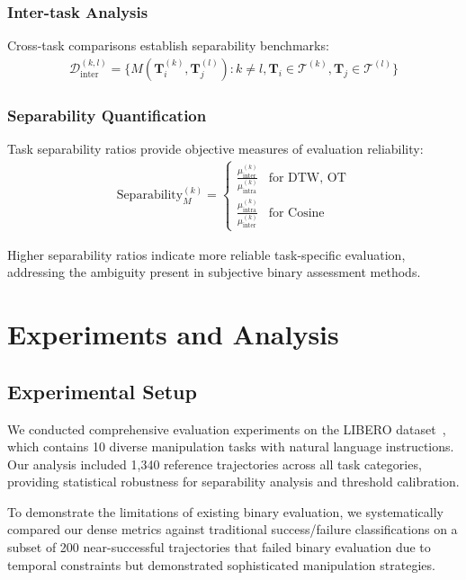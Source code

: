 \documentclass[10pt,twocolumn]{article}
\begin{document}
\subsubsection{Inter-task Analysis}
Cross-task comparisons establish separability benchmarks:
\begin{align}
\mathcal{D}_{\text{inter}}^{(k,l)} = \{M(\mathbf{T}_i^{(k)}, \mathbf{T}_j^{(l)}) : k \neq l, \mathbf{T}_i \in \mathcal{T}^{(k)}, \mathbf{T}_j \in \mathcal{T}^{(l)}\}
\end{align}

\subsubsection{Separability Quantification}
Task separability ratios provide objective measures of evaluation reliability:
\begin{align}
\text{Separability}_M^{(k)} = \begin{cases}
\frac{\mu_{\text{inter}}^{(k)}}{\mu_{\text{intra}}^{(k)}} & \text{for DTW, OT} \\
\frac{\mu_{\text{intra}}^{(k)}}{\mu_{\text{inter}}^{(k)}} & \text{for Cosine}
\end{cases}
\end{align}

Higher separability ratios indicate more reliable task-specific evaluation, addressing the ambiguity present in subjective binary assessment methods.

\section{Experiments and Analysis}

\subsection{Experimental Setup}

We conducted comprehensive evaluation experiments on the LIBERO dataset~\cite{liu2023libero}, which contains 10 diverse manipulation tasks with natural language instructions. Our analysis included 1,340 reference trajectories across all task categories, providing statistical robustness for separability analysis and threshold calibration.

To demonstrate the limitations of existing binary evaluation, we systematically compared our dense metrics against traditional success/failure classifications on a subset of 200 near-successful trajectories that failed binary evaluation due to temporal constraints but demonstrated sophisticated manipulation strategies.
\end{document}
